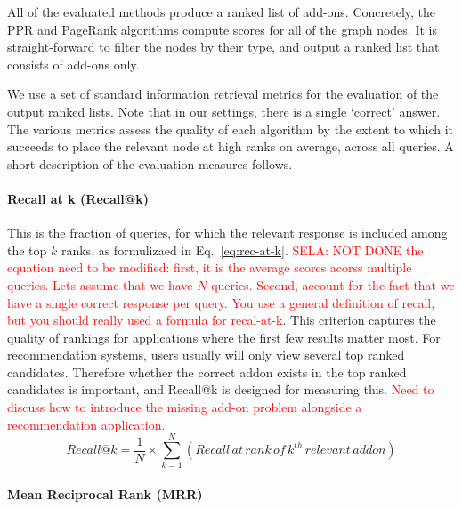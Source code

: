 \documentclass[11pt,oneside]{book}
\begin{document}

All of the evaluated methods produce a ranked list of add-ons. 
Concretely, the PPR and PageRank algorithms compute scores for all of the graph nodes.
It is straight-forward to filter the nodes by their type, and output a ranked list that consists of add-ons only.


We use a set of standard information retrieval metrics for the evaluation of the output ranked lists. Note that in our settings, there is a single `correct' answer. The various metrics assess the quality of each algorithm by the extent to which it succeeds to 
place the relevant node at high ranks on average, across all queries. A short description of the evaluation measures follows.

\paragraph{Recall at k (Recall@k)}
This is the fraction of queries, for which the relevant response is included among the top $k$ ranks, as formulizaed in Eq.~\eqref{eq:rec-at-k}. \textcolor{red}{SELA: NOT DONE the equation need to be modified: first, it is the average scores acorss multiple queries. Lets assume that we have $N$ queries. Second, account for the fact that we have a single correct response per query. You use a general definition of recall, but you should really used a formula for recal-at-k}. This criterion captures the quality of rankings for applications where the first few results matter most. 
For recommendation systems, users usually will only view several top ranked candidates. Therefore
whether the correct addon exists in the top ranked candidates is
important, and Recall@k is designed for measuring this. \textcolor{red}{Need to discuss how to introduce the missing add-on problem alongside a recommendation application.}
\begin{equation}
 Recall@k = \frac{1}{N} \times \displaystyle\sum\limits_{k=1}^{N} (Recall \, at \, rank \, of \, k^{th} \, relevant \, addon)
\label{eq:rec-at-k}
\end{equation}


\paragraph{Mean Reciprocal Rank (MRR)}
\end{document}
